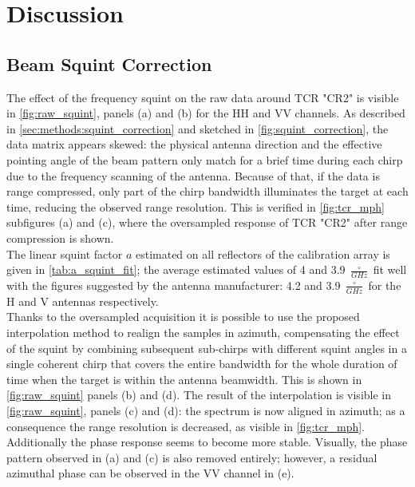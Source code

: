 \section{Discussion}\label{sec:discussion}
\subsection{Beam Squint Correction}\label{sec:discussion:squint_correction}
The effect of the frequency squint on the raw data around TCR "CR2" is visible in \autoref{fig:raw_squint}, panels (a) and (b) for the HH and VV channels. As described in 
\autoref{sec:methods:squint_correction} and sketched in \autoref{fig:squint_correction}, the data matrix appears skewed:  the physical antenna direction and the effective pointing angle of the beam pattern only match for a brief time during each chirp due to the frequency scanning of the antenna. Because of that, if the data is range compressed, only part of the chirp bandwidth illuminates the target at each time, reducing the observed range resolution. This is verified in \autoref{fig:tcr_mph} subfigures (a) and (c), where the oversampled response of TCR "CR2" after range compression is shown.\\
The linear squint factor $a$ estimated on all reflectors of the calibration array is given in \autoref{tab:a_squint_fit};
the average estimated values of 4 and 3.9 $\frac{\circ}{GHz}$  fit well with the figures suggested by the antenna manufacturer: 4.2 and 3.9 $\frac{\circ}{GHz}$ for the H and V antennas respectively.\\
Thanks to the oversampled acquisition it is possible to use the proposed interpolation method to realign the samples in azimuth, compensating the effect of the squint by combining subsequent sub-chirps with different squint angles in a single coherent chirp that covers the entire bandwidth for the whole duration of time when the target is within the antenna beamwidth. This is shown in \autoref{fig:raw_squint} panels (b) and (d). The result of the interpolation is visible in \autoref{fig:raw_squint}, panels (c) and (d): the spectrum is now aligned in azimuth; as a consequence the range resolution is decreased, as visible in \autoref{fig:tcr_mph}. Additionally the phase response seems to become more stable.
Visually, the phase pattern observed in (a) and (c) is also removed entirely; however, a residual azimuthal phase can be observed in the VV channel in (e).
